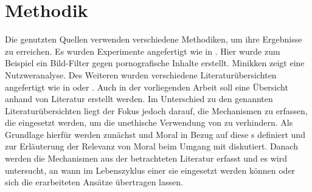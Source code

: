 \chapter{Methodik}

Die genutzten Quellen verwenden verschiedene Methodiken, um ihre Ergebnisse zu erreichen. Es wurden Experimente angefertigt wie in \cite{Zheng}. Hier wurde zum Beispiel ein Bild-Filter gegen pornografische Inhalte erstellt. Minikken \cite{Minkkinen} zeigt eine Nutzweranalyse. Des Weiteren wurden verschiedene Literaturübersichten angefertigt wie in \cite{Srinivasan} oder \cite{Jobin}. Auch in der vorliegenden Arbeit soll eine Übersicht anhand von Literatur erstellt werden. Im Unterschied zu den genannten Literaturübersichten liegt der Fokus jedoch darauf, die Mechanismen zu erfassen, die eingesetzt werden, um die unethische Verwendung von  zu verhindern. Als Grundlage hierfür werden zunächst  und Moral in Bezug auf diese s definiert und zur Erläuterung der Relevanz von Moral beim Umgang mit  diskutiert. Danach werden die Mechanismen aus der betrachteten Literatur erfasst und es wird untersucht, an wann im Lebenszyklus einer  sie eingesetzt werden können oder sich die erarbeiteten Ansätze übertragen lassen.